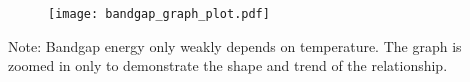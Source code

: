 \documentclass{article}
\begin{document}
\begin{figure}
\texttt{[image: bandgap\_graph\_plot.pdf]}
\end{figure}
\noindent
Note: Bandgap energy only weakly depends on temperature. The graph is zoomed in only to demonstrate the shape and trend of the relationship.
\end{document}
